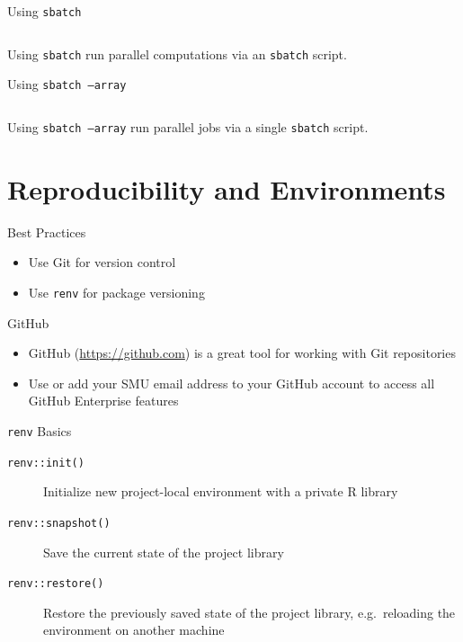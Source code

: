 \documentclass[aspectratio=169]{beamer}
\begin{document}
\begin{frame}{Using \texttt{sbatch}}
\begin{listing}[H]
\inputminted{sh}{examples/r_workflows/05_sbatch_standard-mem-s.sbatch}
\caption{Using \texttt{sbatch} run parallel computations via an \texttt{sbatch} script.}
\end{listing}
\end{frame}

\begin{frame}{Using \texttt{sbatch --array}}
\begin{listing}[H]
\inputminted{sh}{examples/r_workflows/06_sbatch_array.sbatch}
\caption{Using \texttt{sbatch --array} run parallel jobs via a single \texttt{sbatch} script.}
\end{listing}
\end{frame}

\section{Reproducibility and Environments}

\begin{frame}{Best Practices}
\begin{itemize}
\item Use Git for version control
\item Use \texttt{renv} for package versioning
\end{itemize}
\end{frame}

\begin{frame}{GitHub}
\begin{itemize}
\item GitHub (\url{https://github.com}) is a great tool for working with Git repositories
\item Use or add your SMU email address to your GitHub account to access all GitHub Enterprise features
\end{itemize}
\end{frame}


\begin{frame}{\texttt{renv} Basics}
\begin{description}
\item[\texttt{renv::init()}] Initialize new project-local environment with a private R library
\item[\texttt{renv::snapshot()}] Save the current state of the project library
\item[\texttt{renv::restore()}] Restore the previously saved state of the project library, e.g.\ reloading the environment on another machine
\end{description}
\end{frame}
\end{document}
